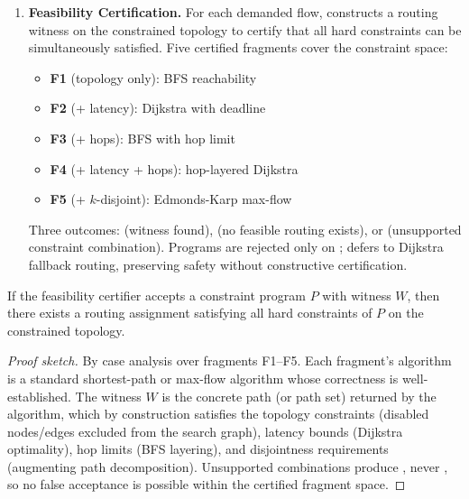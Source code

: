 \begin{enumerate}
\item \textbf{Feasibility Certification.} For each demanded flow,
constructs a routing witness on the constrained topology to certify
that all hard constraints can be simultaneously satisfied. Five
certified fragments cover the constraint space:
\begin{itemize}
\item \textbf{F1} (topology only): BFS reachability
\item \textbf{F2} (+ latency): Dijkstra with deadline
\item \textbf{F3} (+ hops): BFS with hop limit
\item \textbf{F4} (+ latency + hops): hop-layered Dijkstra
\item \textbf{F5} (+ $k$-disjoint): Edmonds-Karp max-flow
\end{itemize}
Three outcomes:  (witness found), 
(no feasible routing exists), or  (unsupported
constraint combination). Programs are rejected only on ;
 defers to Dijkstra fallback routing, preserving
safety without constructive certification.
\end{enumerate}

\begin{theorem}
If the feasibility certifier accepts a constraint program $P$ with
witness $W$, then there exists a routing assignment satisfying all
hard constraints of $P$ on the constrained topology.
\end{theorem}

\begin{proof}[Proof sketch]
By case analysis over fragments F1--F5. Each fragment's algorithm
is a standard shortest-path or max-flow algorithm whose correctness
is well-established. The witness $W$ is the concrete path (or path set)
returned by the algorithm, which by construction satisfies the
topology constraints (disabled nodes/edges excluded from the search
graph), latency bounds (Dijkstra optimality), hop limits (BFS layering),
and disjointness requirements (augmenting path decomposition).
Unsupported combinations produce , never
, so no false acceptance is possible within the
certified fragment space.
\end{proof}

